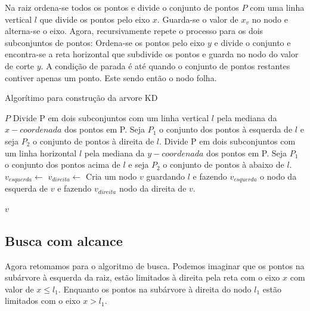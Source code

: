 Na raiz ordena-se todos os pontos e divide o conjunto de pontos \(P\) com uma linha vertical
\(l\) que divide os pontos pelo eixo \(x\). Guarda-se o valor de \(x_v\) no nodo e alterna-se o
eixo.
Agora, recursivamente repete o processo para os dois subconjuntos de pontos:
Ordena-se os pontos pelo eixo \(y\) e divide o conjunto e encontra-se a reta horizontal que
subdivide os pontos e guarda no nodo do valor de corte \(y\).
A condição de parada é até quando o conjunto de pontos restantes contiver apenas um ponto.
Este sendo então o nodo folha.


\begin{algorithm}
    \caption{Algorítimo para construção da arvore KD}
    \begin{algorithmic}[1]
            \Return $P$
        \Else
            \State
                Divide P em dois subconjuntos com um linha vertical $l$ pela mediana da $x-coordenada$
                dos pontos em P. Seja $P_1$ o conjunto dos pontos à esquerda de $l$ e seja
                $P_2$ o conjunto de pontos à direita de $l$.
            \Else
            \State
                Divide P em dois subconjuntos com um linha horizontal $l$ pela mediana da $y-coordenada$
                dos pontos em P. Seja $P_1$ o conjunto dos pontos acima de $l$ e seja
                $P_2$ o conjunto de pontos à abaixo de $l$.
            \EndIf
        \EndIf
        \State $v_{esquerda} \leftarrow $ 
        \State $v_{direita} \leftarrow $ 
        \State Cria um nodo $v$ guardando $l$ e fazendo $v_{esquerda}$ o nodo da esquerda
        de $v$ e fazendo $v_{direita}$ nodo da direita de $v$.

        \Return $v$
        \EndFunction
    \end{algorithmic}
\end{algorithm}

\subsection{Busca com alcance}

Agora retomamos para o algoritmo de busca. Podemos imaginar que os pontos na subárvore à esquerda
da raiz, estão limitados à direita pela reta com o eixo \(x\) com valor de \(x \leq l_1\).
Enquanto os pontos na subárvore à direita do nodo \(l_1\) estão limitados com o eixo \(x > l_1\).

